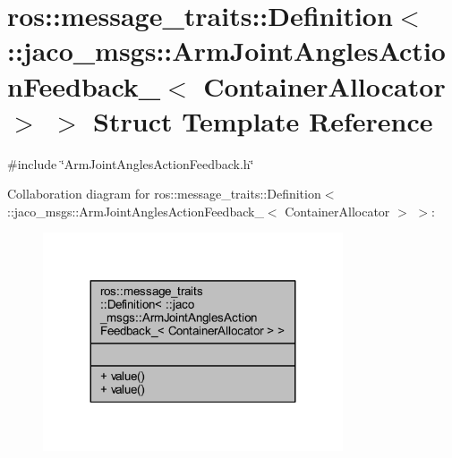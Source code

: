 \hypertarget{structros_1_1message__traits_1_1Definition_3_01_1_1jaco__msgs_1_1ArmJointAnglesActionFeedback___f7a0265498d8f0c8bfa24eb4de39e338}{}\section{ros\+:\+:message\+\_\+traits\+:\+:Definition$<$ \+:\+:jaco\+\_\+msgs\+:\+:Arm\+Joint\+Angles\+Action\+Feedback\+\_\+$<$ Container\+Allocator $>$ $>$ Struct Template Reference}
\label{structros_1_1message__traits_1_1Definition_3_01_1_1jaco__msgs_1_1ArmJointAnglesActionFeedback___f7a0265498d8f0c8bfa24eb4de39e338}


{\ttfamily \#include \char`\"{}Arm\+Joint\+Angles\+Action\+Feedback.\+h\char`\"{}}



Collaboration diagram for ros\+:\+:message\+\_\+traits\+:\+:Definition$<$ \+:\+:jaco\+\_\+msgs\+:\+:Arm\+Joint\+Angles\+Action\+Feedback\+\_\+$<$ Container\+Allocator $>$ $>$\+:
\nopagebreak
\begin{figure}[H]
\begin{center}
\leavevmode
\includegraphics[width=251pt]{d3/d0c/structros_1_1message__traits_1_1Definition_3_01_1_1jaco__msgs_1_1ArmJointAnglesActionFeedback___29a8eb6ded2d4e32e916d91fa6c69eed}
\end{center}
\end{figure}
